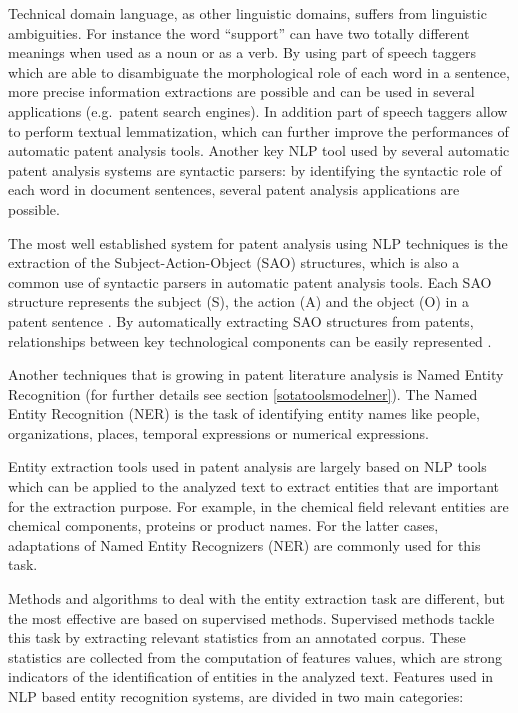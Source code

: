\documentclass[]{book}
\theoremstyle{definition}
\theoremstyle{definition}
\theoremstyle{definition}
\theoremstyle{remark}
\begin{document}
Technical domain language, as other linguistic domains, suffers from
linguistic ambiguities. For instance the word ``support'' can have two
totally different meanings when used as a noun or as a verb. By using
part of speech taggers which are able to disambiguate the morphological
role of each word in a sentence, more precise information extractions
are possible and can be used in several applications (e.g.~patent search
engines). In addition part of speech taggers allow to perform textual
lemmatization, which can further improve the performances of automatic
patent analysis tools. Another key NLP tool used by several automatic
patent analysis systems are syntactic parsers: by identifying the
syntactic role of each word in document sentences, several patent
analysis applications are possible.

The most well established system for patent analysis using NLP
techniques is the extraction of the Subject-Action-Object (SAO)
structures, which is also a common use of syntactic parsers in automatic
patent analysis tools. Each SAO structure represents the subject (S),
the action (A) and the object (O) in a patent sentence
\citep{yoon2011identifying}. By automatically extracting SAO structures
from patents, relationships between key technological components can be
easily represented
\citep{yoon2013identifying, choi2011sao, park2011identifying}.

Another techniques that is growing in patent literature analysis is
Named Entity Recognition (for further details see section
\ref{sotatoolsmodelner}). The Named Entity Recognition (NER) is the task
of identifying entity names like people, organizations, places, temporal
expressions or numerical expressions.

Entity extraction tools used in patent analysis are largely based on NLP
tools which can be applied to the analyzed text to extract entities that
are important for the extraction purpose. For example, in the chemical
field relevant entities are chemical components, proteins or product
names. For the latter cases, adaptations of Named Entity Recognizers
(NER) are commonly used for this task.

Methods and algorithms to deal with the entity extraction task are
different, but the most effective are based on supervised methods.
Supervised methods tackle this task by extracting relevant statistics
from an annotated corpus. These statistics are collected from the
computation of features values, which are strong indicators of the
identification of entities in the analyzed text. Features used in NLP
based entity recognition systems, are divided in two main categories:
\end{document}
